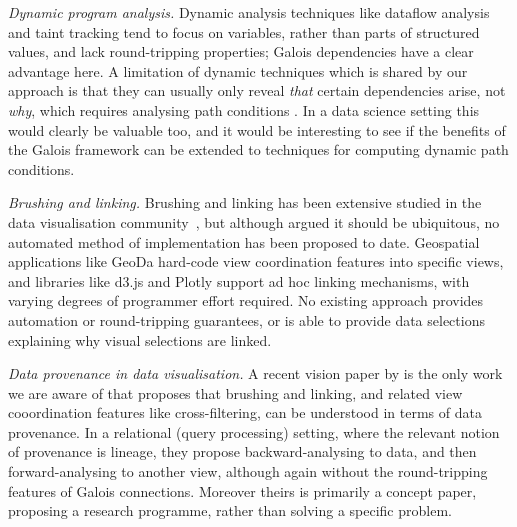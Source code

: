 \emph{Dynamic program analysis.} Dynamic analysis techniques like dataflow analysis \cite{chen88,reps95} and taint tracking \cite{reps95} tend to focus on variables, rather than parts of structured values, and lack round-tripping properties; Galois dependencies have a clear advantage here. A limitation of dynamic techniques which is shared by our approach is that they can usually only reveal \emph{that} certain dependencies arise, not \emph{why}, which requires analysing path conditions \cite{hammer06}. In a data science setting this would clearly be valuable too, and it would be interesting to see if the benefits of the Galois framework can be extended to techniques for computing dynamic path conditions.

\emph{Brushing and linking.} Brushing and linking has been extensive studied in the data visualisation community~\cite{mcdonald82,becker87}, but although \citet{roberts06} argued it should be ubiquitous, no automated method of implementation has been proposed to date. Geospatial applications like GeoDa \cite{anselin06} hard-code view coordination features into specific views, and libraries like d3.js and Plotly support ad hoc linking mechanisms, with varying degrees of programmer effort required. No existing approach provides automation or round-tripping guarantees, or is able to provide data selections explaining why visual selections are linked.

\emph{Data provenance in data visualisation.} A recent vision paper by \citet{psallidas18} is the only work we are aware of that proposes that brushing and linking, and related view cooordination features like cross-filtering, can be understood in terms of data provenance. In a relational (query processing) setting, where the relevant notion of provenance is lineage, they propose backward-analysing to data, and then forward-analysing to another view, although again without the round-tripping features of Galois connections. Moreover theirs is primarily a concept paper, proposing a research programme, rather than solving a specific problem.
